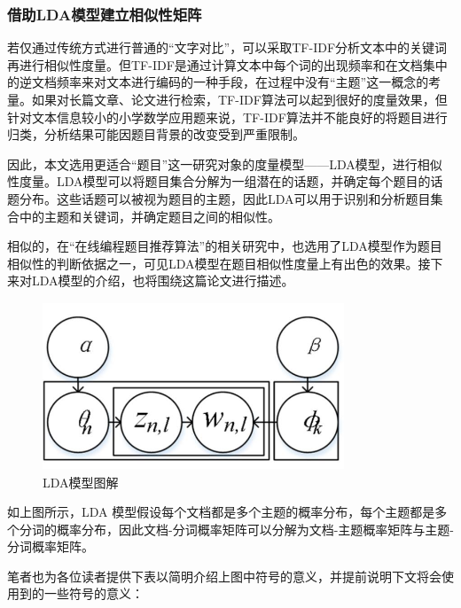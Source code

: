\subsubsection{借助LDA模型建立相似性矩阵}

若仅通过传统方式进行普通的“文字对比”，可以采取TF-IDF分析文本中的关键词再进行相似性度量。但TF-IDF是通过计算文本中每个词的出现频率和在文档集中的逆文档频率来对文本进行编码的一种手段，在过程中没有“主题”这一概念的考量。如果对长篇文章、论文进行检索，TF-IDF算法可以起到很好的度量效果，但针对文本信息较小的小学数学应用题来说，TF-IDF算法并不能良好的将题目进行归类，分析结果可能因题目背景的改变受到严重限制。

因此，本文选用更适合“题目”这一研究对象的度量模型——LDA模型，进行相似性度量。LDA模型可以将题目集合分解为一组潜在的话题，并确定每个题目的话题分布。这些话题可以被视为题目的主题，因此LDA可以用于识别和分析题目集合中的主题和关键词，并确定题目之间的相似性。

相似的，在“在线编程题目推荐算法”的相关研究中\cite{LuoRongHeZhiShiDianYuTuJuanJiDeZaiXianBianChengTiMuTuiJianSuanFa}，也选用了LDA模型作为题目相似性的判断依据之一，可见LDA模型在题目相似性度量上有出色的效果。接下来对LDA模型的介绍，也将围绕这篇论文进行描述。
\begin{figure}[htbp]
    \centering
    \includegraphics[width=9cm,height=5cm]{res/LDA.jpg}
    \caption{LDA模型图解}
\end{figure} 

如上图所示，LDA 模型假设每个文档都是多个主题的概率分布，每个主题都是多个分词的概率分布，因此文档-分词概率矩阵可以分解为文档-主题概率矩阵与主题-分词概率矩阵。

笔者也为各位读者提供下表以简明介绍上图中符号的意义，并提前说明下文将会使用到的一些符号的意义：

